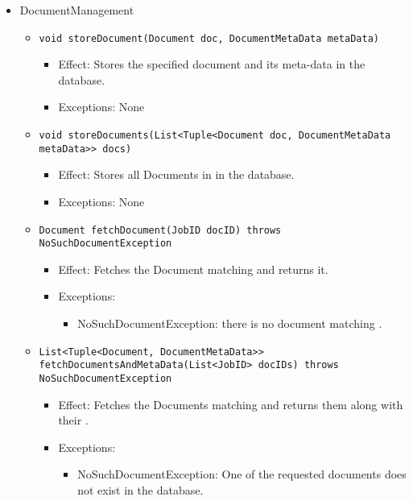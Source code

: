 \begin{itemize}
    \item DocumentManagement
	\begin{itemize}
		\item \texttt{void storeDocument(Document doc, DocumentMetaData metaData)}
		\begin{itemize}
			\item Effect: Stores the specified document and its meta-data in the database.
			\item Exceptions: None
		\end{itemize}

		\item \texttt{void storeDocuments(List<Tuple<Document doc, DocumentMetaData metaData>> docs)}
		\begin{itemize}
			\item Effect: Stores all Documents in  in the database.
			\item Exceptions: None
		\end{itemize}
		
		\item \texttt{Document fetchDocument(JobID docID) throws NoSuchDocumentException}
		\begin{itemize}
			\item Effect: Fetches the Document matching  and returns it.
			\item Exceptions: 
			\begin{itemize}
				\item NoSuchDocumentException: there is no document matching .
			\end{itemize}
		\end{itemize}

		\item \texttt{List<Tuple<Document, DocumentMetaData>> fetchDocumentsAndMetaData(List<JobID> docIDs) throws NoSuchDocumentException}
		\begin{itemize}
			\item Effect: Fetches the Documents matching  and returns them along with their .
			\item Exceptions: 
			\begin{itemize}
				\item NoSuchDocumentException: One of the requested documents does not exist in the database.
			\end{itemize}
		\end{itemize}


\end{itemize}
\end{itemize}
